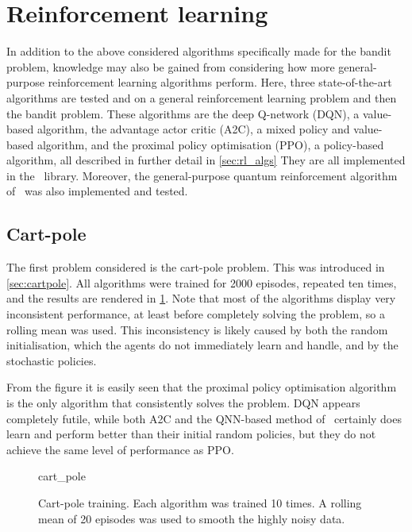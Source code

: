 \section{Reinforcement learning}
\label{sec:sim_rl}

In addition to the above considered algorithms specifically made for the bandit problem, knowledge may also be gained from considering how more general-purpose reinforcement learning algorithms perform.
Here, three state-of-the-art algorithms are tested and on a general reinforcement learning problem and then the bandit problem.
These algorithms are the deep Q-network (DQN), a value-based algorithm, the advantage actor critic (A2C), a mixed policy and value-based algorithm, and the proximal policy optimisation (PPO), a policy-based algorithm, all described in further detail in \cref{sec:rl_algs}
They are all implemented in the~\autocite{sb3} library.
Moreover, the general-purpose quantum reinforcement algorithm of~\autocite{jerbi2021} was also implemented and tested.

\subsection{Cart-pole}
\label{sec:sim_rl_cartpole}

The first problem considered is the cart-pole problem.
This was introduced in \cref{sec:cartpole}.
All algorithms were trained for 2000 episodes, repeated ten times, and the results are rendered in \cref{fig:cartpole_training}.
Note that most of the algorithms display very inconsistent performance, at least before completely solving the problem, so a rolling mean was used.
This inconsistency is likely caused by both the random initialisation, which the agents do not immediately learn and handle, and by the stochastic policies.

From the figure it is easily seen that the proximal policy optimisation algorithm is the only algorithm that consistently solves the problem.
DQN appears completely futile, while both A2C and the QNN-based method of~\autocite{jerbi2021} certainly does learn and perform better than their initial random policies, but they do not achieve the same level of performance as PPO.


\begin{figure}
    \centering
    {cart_pole}
    \caption[
        Cart-pole training.
    ]
    {
        Cart-pole training.
        Each algorithm was trained 10 times.
        A rolling mean of 20 episodes was used to smooth the highly noisy data.
    }
    \label{fig:cartpole_training}
\end{figure}

